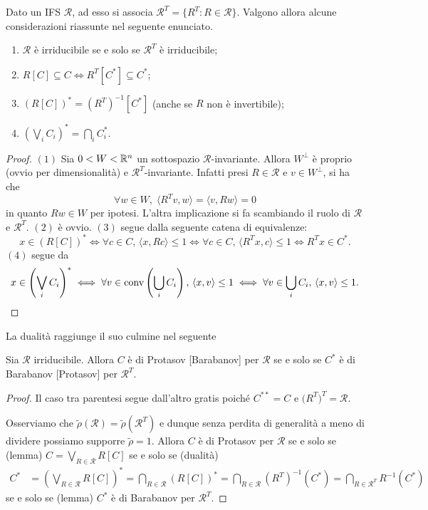 Dato un IFS $\mathcal R$, ad esso si associa $\mathcal R^{T} = \{R^{T}:R\in\mathcal R\}$. Valgono allora alcune considerazioni riassunte nel seguente enunciato.
\begin{lemma}
	\begin{enumerate}
		\item $\mathcal R$ è irriducibile se e solo se $\mathcal R^{T}$ è irriducibile;
		\item $R[C]\subseteq C\iff R^{T}[C^{*}]\subseteq C^{*}$;
		\item $(R[C])^{*} = (R^{T})^{-1}[C^{*}]$ (anche se $R$ non è invertibile);
		\item $(\bigvee_{i} C_{i})^{*} = \bigcap_{i} C_{i}^{*}$.
	\end{enumerate}
\end{lemma}
\begin{proof}
	$(1)$ Sia $0<W<\mathbb{R}^{n}$ un sottospazio $\mathcal R$-invariante. Allora $W^{\perp}$ è proprio (ovvio per dimensionalità) e $\mathcal R^{T}$-invariante. Infatti presi $R\in\mathcal R$ e $v\in W^{\perp}$, si ha che 
	$$\forall w\in W,\; \langle R^{T}v, w\rangle = \langle v, Rw\rangle = 0$$
	in quanto $Rw\in W$ per ipotesi. L'altra implicazione si fa scambiando il ruolo di $\mathcal R$ e $\mathcal R^{T}$.
	$(2)$ è ovvio. 
	$(3)$ segue dalla seguente catena di equivalenze: 
	$$x\in(R[C])^{*} \iff \forall c\in C,\,\langle x, Rc\rangle\leq1\iff\forall c\in C,\,\langle R^{T}x, c\rangle\leq1\iff R^{T}x\in C^{*}.$$
	$(4)$ segue da 
	$$x\in\left(\bigvee_{i}C_{i}\right)^{*}\iff \forall v\in\operatorname{conv}\left(\bigcup_{i}C_{i}\right),\,\langle x,v\rangle\leq1\iff\forall v\in\bigcup_{i}C_{i},\,\langle x,v\rangle\leq 1.$$
\end{proof}

La dualità raggiunge il suo culmine nel seguente
\begin{lemma}[di Wirth]
	Sia $\mathcal R$ irriducibile. Allora $C$ è di Protasov [Barabanov] per $\mathcal R$ se e solo se $C^{*}$ è di Barabanov [Protasov] per $\mathcal R^{T}$.
\end{lemma}
\begin{proof}
	Il caso tra parentesi segue dall'altro gratis poiché $C^{**} = C$ e $\mathcal (R^{T})^{T} = \mathcal R$.
	
	Osserviamo che $\tilde\rho(\mathcal R) = \tilde\rho(\mathcal R^{T})$ e dunque senza perdita di generalità a meno di dividere possiamo supporre $\tilde\rho = 1$. Allora $C$ è di Protasov per $\mathcal R$ se e solo se (lemma) $C = \bigvee_{R\in\mathcal R}R[C]$ se e solo se (dualità)
	\begin{align*}
		C^{*} &= 
		\left(\bigvee_{R\in\mathcal R}R[C]\right)^{*} = 
		\bigcap_{R\in\mathcal R}(R[C])^{*} = 
		\bigcap_{R\in\mathcal R}(R^{T})^{-1}(C^{*}) = 
		\bigcap_{R\in\mathcal R^{T}}R^{-1}(C^{*})
	\end{align*}
	se e solo se (lemma) $C^{*}$ è di Barabanov per $\mathcal R^{T}$.
\end{proof}


